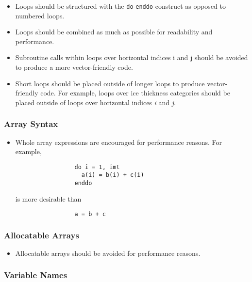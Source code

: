 \begin{itemize}
  \item  Loops should be structured with the {\tt do}-{\tt enddo} construct as
         opposed to numbered loops.
  \item  Loops should be combined as much as possible for readability and
         performance.
  \item  Subroutine calls within loops over horizontal indices i and j should
         be avoided to produce a more vector-friendly code.
  \item  Short loops should be placed outside of longer loops to produce 
         vector-friendly code.  For example, loops over ice thickness categories
         should be placed outside of loops over horizontal indices {\it i}
         and {\it j}.
\end{itemize}

\subsubsection*{Array Syntax}

\begin{itemize}
  \item Whole array expressions are encouraged for performance reasons.
        For example,
  \begin{verbatim}
                 do i = 1, imt
                   a(i) = b(i) + c(i)
                 enddo
  \end{verbatim}
  is more desirable than
  \begin{verbatim}
                 a = b + c
  \end{verbatim}
   
\end{itemize}

\subsubsection*{Allocatable Arrays}
\begin{itemize}
  \item Allocatable arrays should be avoided for performance reasons.
\end{itemize}

\subsubsection*{Variable Names}

